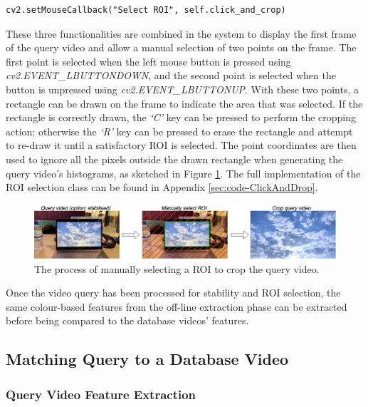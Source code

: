 \begin{lstlisting}[numbers=none]
cv2.setMouseCallback("Select ROI", self.click_and_crop)
\end{lstlisting}

These three functionalities are combined in the system to display the first frame of the query video and allow a manual selection of two points on the frame. The first point is selected when the left mouse button is pressed using \textit{cv2.EVENT\_LBUTTONDOWN}, and the second point is selected when the button is unpressed using \textit{cv2.EVENT\_LBUTTONUP}. With these two points, a rectangle can be drawn on the frame to indicate the area that was selected. If the rectangle is correctly drawn, the \textit{`C'} key can be pressed to perform the cropping action; otherwise the \textit{`R'} key can be pressed to erase the rectangle and attempt to re-draw it until a satisfactory ROI is selected. The point coordinates are then used to ignore all the pixels outside the drawn rectangle when generating the query video's histograms, as sketched in Figure \ref{fig:implementation-roi_selection}. The full implementation of the ROI selection class can be found in Appendix \ref{sec:code-ClickAndDrop}.\\

\begin{figure}[h] 
\centerline{\includegraphics[width=\textwidth]{figures/implementation/roi_selection.png}}
\caption{\label{fig:implementation-roi_selection}The process of manually selecting a ROI to crop the query video.}
\end{figure}

Once the video query has been processed for stability and ROI selection, the same colour-based features from the off-line extraction phase can be extracted before being compared to the database videos' features.


\subsection{Matching Query to a Database Video}

\subsubsection{Query Video Feature Extraction}

